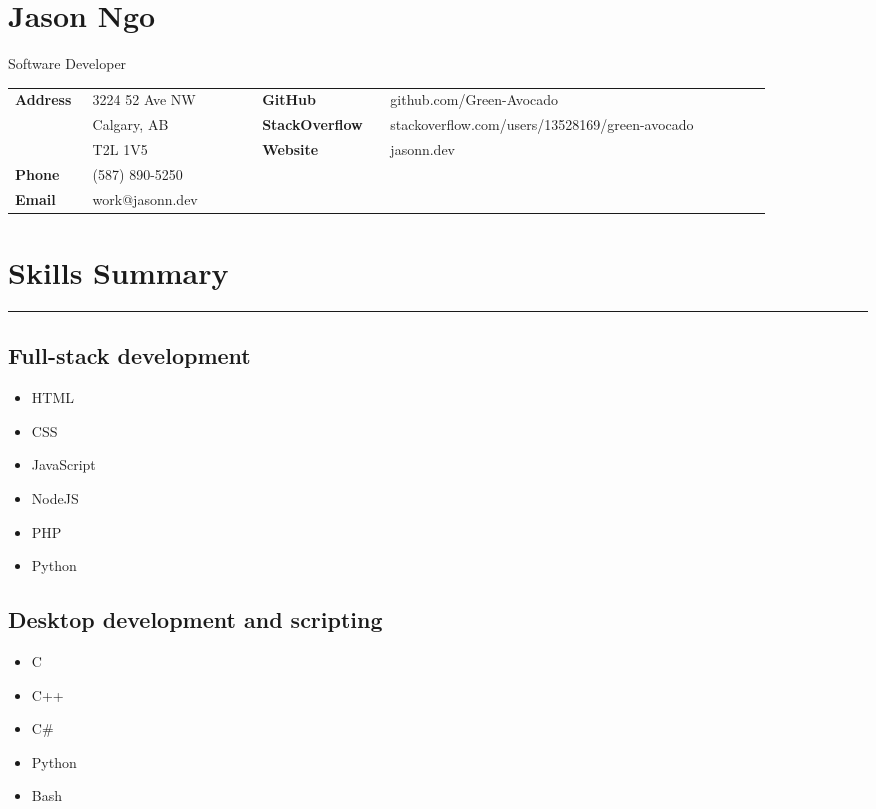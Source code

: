 \documentclass[letterpaper]{article}
\newcommand{\horizontalLine}{%
    \rule{\linewidth}{0.4pt}
    \vspace{1ex}
}
\begin{document}
    \section*{Jason Ngo}

    {\large
    Software Developer}

    {\small%
        \renewcommand{\arraystretch}{1.5}
        \begin{tabular}{p{0.08\linewidth} p{0.2\linewidth} p{0.15\linewidth} p{0.45\linewidth}}
            \\
            \textbf{Address} & 3224 52 Ave NW & \textbf{GitHub} & github.com/Green-Avocado \\
            & Calgary, AB & \textbf{StackOverflow} & stackoverflow.com/users/13528169/green-avocado \\
            & T2L 1V5 & \textbf{Website} & jasonn.dev \\
            \textbf{Phone} & (587) 890-5250 \\
            \textbf{Email} & work@jasonn.dev \\
        \end{tabular}
    }

    \section*{Skills Summary}

        \horizontalLine

        \subsection*{Full-stack development}

        \begin{itemize}[itemsep = 0pt]
            \item HTML
            \item CSS
            \item JavaScript
            \item NodeJS
            \item PHP
            \item Python
        \end{itemize}

        \subsection*{Desktop development and scripting}

        \begin{itemize}[itemsep = 0pt]
            \item C
            \item C++
            \item C\#
            \item Python
            \item Bash
        \end{itemize}
\end{document}

